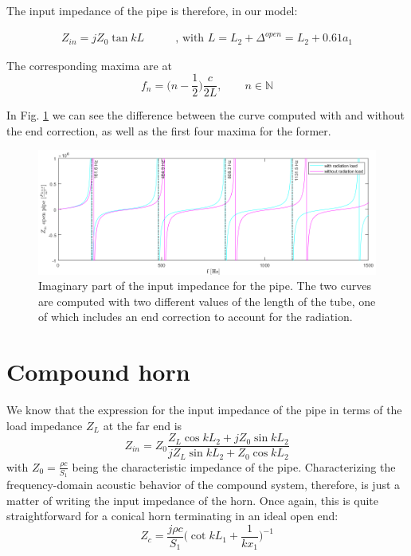 \documentclass[a4paper]{article}
\begin{document}
The input impedance of the pipe is therefore, in our model:

\begin{align*}
	Z_{in} = jZ_0 \tan{kL} \qquad & \text{, with } L = L_2 + \Delta^{open} = L_2 + 0.61a_1
\end{align*}

The corresponding maxima are at
$$ f_n = \biggl(n - \frac{1}{2}\biggr) \frac{c}{2L}, \qquad n \in \mathbb{N} $$

In Fig. \ref{fig:pipe} we can see the difference between the curve computed with and without the end correction, as well as the first four maxima for the former.

\begin{figure}[h!]
	\centering
	\includegraphics[width=0.9\linewidth]{input_impedance_pipe.png}
	\caption{Imaginary part of the input impedance for the pipe. The two curves are computed with two different values of the length of the tube, one of which includes an end correction to account for the radiation.}
	\label{fig:pipe}
\end{figure}

\section{Compound horn}
We know that the expression for the input impedance of the pipe in terms of the load impedance $Z_L$ at the far end is
\begin{equation}\label{eq:zin}
	Z_{in} = Z_0 \frac{Z_L \cos{kL_2} + jZ_0\sin{kL_2}}{jZ_L \sin{kL_2} + Z_0 \cos{kL_2}}
\end{equation}
with $Z_0 = \frac{\rho c}{S_1}$ being the characteristic impedance of the pipe. Characterizing the frequency-domain acoustic behavior of the compound system, therefore, is just a matter of writing the input impedance of the horn. Once again, this is quite straightforward for a conical horn terminating in an ideal open end:
\begin{equation}\label{eq:zc}
	Z_c = \frac{j\rho c}{S_1} \biggl( \cot{kL_1} + \frac{1}{kx_1} \biggr)^{-1}
\end{equation}
\end{document}
